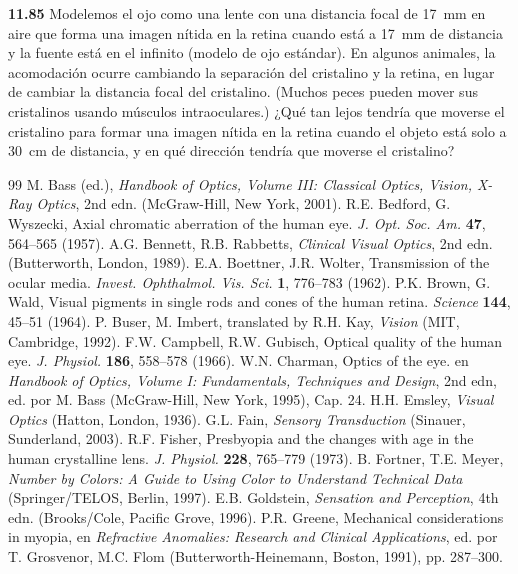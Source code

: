 \documentclass[12pt]{book}
\begin{document}
\textbf{11.85} Modelemos el ojo como una lente con una distancia focal de 17~mm en aire que forma una imagen nítida en la retina cuando está a 17~mm de distancia y la fuente está en el infinito (modelo de ojo estándar). En algunos animales, la acomodación ocurre cambiando la separación del cristalino y la retina, en lugar de cambiar la distancia focal del cristalino. (Muchos peces pueden mover sus cristalinos usando músculos intraoculares.) ¿Qué tan lejos tendría que moverse el cristalino para formar una imagen nítida en la retina cuando el objeto está solo a 30~cm de distancia, y en qué dirección tendría que moverse el cristalino?


\begin{thebibliography}{99}
 M. Bass (ed.), \textit{Handbook of Optics, Volume III: Classical Optics, Vision, X-Ray Optics}, 2nd edn. (McGraw-Hill, New York, 2001).
 R.E. Bedford, G. Wyszecki, Axial chromatic aberration of the human eye. \textit{J. Opt. Soc. Am.} \textbf{47}, 564--565 (1957).
 A.G. Bennett, R.B. Rabbetts, \textit{Clinical Visual Optics}, 2nd edn. (Butterworth, London, 1989).
 E.A. Boettner, J.R. Wolter, Transmission of the ocular media. \textit{Invest. Ophthalmol. Vis. Sci.} \textbf{1}, 776--783 (1962).
 P.K. Brown, G. Wald, Visual pigments in single rods and cones of the human retina. \textit{Science} \textbf{144}, 45--51 (1964).
 P. Buser, M. Imbert, translated by R.H. Kay, \textit{Vision} (MIT, Cambridge, 1992).
 F.W. Campbell, R.W. Gubisch, Optical quality of the human eye. \textit{J. Physiol.} \textbf{186}, 558--578 (1966).
 W.N. Charman, Optics of the eye. en \textit{Handbook of Optics, Volume I: Fundamentals, Techniques and Design}, 2nd edn, ed. por M. Bass (McGraw-Hill, New York, 1995), Cap. 24.
 H.H. Emsley, \textit{Visual Optics} (Hatton, London, 1936).
 G.L. Fain, \textit{Sensory Transduction} (Sinauer, Sunderland, 2003).
 R.F. Fisher, Presbyopia and the changes with age in the human crystalline lens. \textit{J. Physiol.} \textbf{228}, 765--779 (1973).
 B. Fortner, T.E. Meyer, \textit{Number by Colors: A Guide to Using Color to Understand Technical Data} (Springer/TELOS, Berlin, 1997).
 E.B. Goldstein, \textit{Sensation and Perception}, 4th edn. (Brooks/Cole, Pacific Grove, 1996).
 P.R. Greene, Mechanical considerations in myopia, en \textit{Refractive Anomalies: Research and Clinical Applications}, ed. por T. Grosvenor, M.C. Flom (Butterworth-Heinemann, Boston, 1991), pp. 287--300.

\end{thebibliography}
\end{document}
